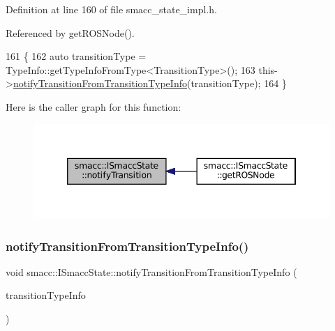 Definition at line 160 of file smacc\+\_\+state\+\_\+impl.\+h.



Referenced by get\+R\+O\+S\+Node().


\begin{DoxyCode}
161 \{
162     \textcolor{keyword}{auto} transitionType = TypeInfo::getTypeInfoFromType<TransitionType>();
163     this->\hyperlink{classsmacc_1_1ISmaccState_acb3dd7d402c634004ae3b67a01169438}{notifyTransitionFromTransitionTypeInfo}(transitionType);
164 \}
\end{DoxyCode}
Here is the caller graph for this function\+:
\nopagebreak
\begin{figure}[H]
\begin{center}
\leavevmode
\includegraphics[width=346pt]{classsmacc_1_1ISmaccState_a98df316afd79180d3c27a15a7d5dd1cf_icgraph}
\end{center}
\end{figure}
\mbox{\label{classsmacc_1_1ISmaccState_acb3dd7d402c634004ae3b67a01169438}} 
\subsubsection{\texorpdfstring{notify\+Transition\+From\+Transition\+Type\+Info()}{notifyTransitionFromTransitionTypeInfo()}}
{\footnotesize\ttfamily void smacc\+::\+I\+Smacc\+State\+::notify\+Transition\+From\+Transition\+Type\+Info (\begin{DoxyParamCaption}\item[{std\+::shared\+\_\+ptr$<$ \hyperlink{classsmacc_1_1introspection_1_1TypeInfo}{smacc\+::introspection\+::\+Type\+Info} $>$ \&}]{transition\+Type\+Info }\end{DoxyParamCaption})}



